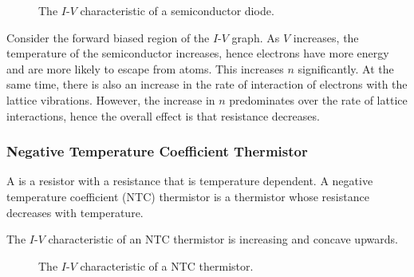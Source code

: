 \begin{figure}[H]
    \centering
    \caption{The $I$-$V$ characteristic of a semiconductor diode.}
\end{figure}

Consider the forward biased region of the $I$-$V$ graph. As $V$ increases, the temperature of the semiconductor increases, hence electrons have more energy and are more likely to escape from atoms. This increases $n$ significantly. At the same time, there is also an increase in the rate of interaction of electrons with the lattice vibrations. However, the increase in $n$ predominates over the rate of lattice interactions, hence the overall effect is that resistance decreases.

\subsubsection{Negative Temperature Coefficient Thermistor}

A  is a resistor with a resistance that is temperature dependent. A negative temperature coefficient (NTC) thermistor is a thermistor whose resistance decreases with temperature.

The $I$-$V$ characteristic of an NTC thermistor is increasing and concave upwards.

\begin{figure}[H]
    \centering
    \caption{The $I$-$V$ characteristic of a NTC thermistor.}
\end{figure}

